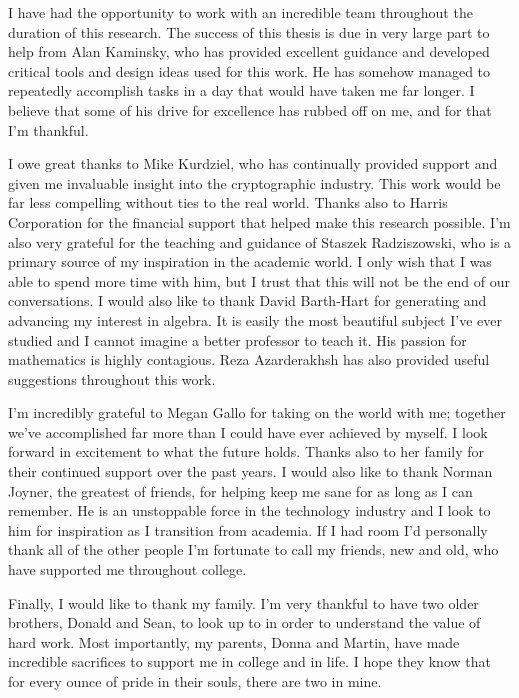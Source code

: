 \documentclass[11pt,american]{report}
\begin{document}
I have had the opportunity to work with an incredible team throughout the duration of this research.
The success of this thesis is due in very large part to help from Alan Kaminsky, who has provided excellent guidance and developed critical tools and design ideas used for this work.
He has somehow managed to repeatedly accomplish tasks in a day that would have taken me far longer.
I believe that some of his drive for excellence has rubbed off on me, and for that I'm thankful.

I owe great thanks to Mike Kurdziel, who has continually provided support and given me invaluable insight into the cryptographic industry.
This work would be far less compelling without ties to the real world.
Thanks also to Harris Corporation for the financial support that helped make this research possible.
I'm also very grateful for the teaching and guidance of Staszek Radziszowski, who is a primary source of my inspiration in the academic world.
I only wish that I was able to spend more time with him, but I trust that this will not be the end of our conversations.
I would also like to thank David Barth-Hart for generating and advancing my interest in algebra.
It is easily the most beautiful subject I've ever studied and I cannot imagine a better professor to teach it.
His passion for mathematics is highly contagious.
Reza Azarderakhsh has also provided useful suggestions throughout this work.

I'm incredibly grateful to Megan Gallo for taking on the world with me; together we've accomplished far more than I could have ever achieved by myself. 
I look forward in excitement to what the future holds.
Thanks also to her family for their continued support over the past years.
I would also like to thank Norman Joyner, the greatest of friends, for helping keep me sane for as long as I can remember.
He is an unstoppable force in the technology industry and I look to him for inspiration as I transition from academia.
If I had room I'd personally thank all of the other people I'm fortunate to call my friends, new and old, who have supported me throughout college.

Finally, I would like to thank my family.
I'm very thankful to have two older brothers, Donald and Sean, to look up to in order to understand the value of hard work.
Most importantly, my parents, Donna and Martin, have made incredible sacrifices to support me in college and in life.
I hope they know that for every ounce of pride in their souls, there are two in mine.
\vfill
\end{document}
